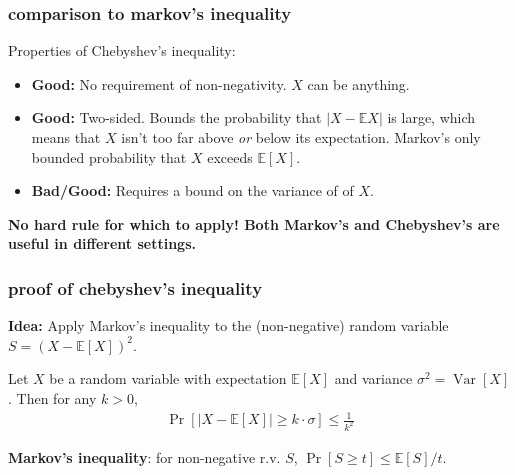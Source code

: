 \documentclass[handout,compress]{beamer}
\newcommand{\E}{\mathbb{E}}
\newcommand{\blue}[1]{\textcolor{blue}{#1}}
\DeclareMathOperator{\Var}{Var}
\begin{document}
\begin{frame}
	\frametitle{comparison to markov's inequality}
	\small
	Properties of Chebyshev's inequality:
	\begin{itemize}
		\item \textbf{Good:} No requirement of non-negativity. $X$ can be anything.
		\item \textbf{Good:} Two-sided. Bounds the probability that $|X - \E X|$ is large, which means that $X$ isn't too far above \emph{or} below its expectation. Markov's only bounded probability that $X$ exceeds $\E[X]$.
		\item \textbf{Bad/Good:} Requires a bound on the variance of of $X$.  
	\end{itemize}
	\alert{\textbf{No hard rule for which to apply! Both Markov's and Chebyshev's are useful in different settings.}}
\end{frame} 

\begin{frame}
	\frametitle{proof of chebyshev's inequality}
	\small
	\textbf{Idea:} Apply Markov's inequality to the (non-negative) random variable $S = (X-\E[X])^2$.
	\begin{lemma}
		Let $X$ be a random variable with expectation $\E[X]$ and variance $\sigma^2 = \Var[X]$. Then for any $k > 0$,
		\begin{align*}
			\Pr[|X - \E[X]| \geq k\cdot\sigma] \leq \frac{1}{k^2}
		\end{align*}
	\end{lemma}
	
	\vspace{7em}
	\begin{block}{\vspace*{-3ex}}
		\small \textbf{Markov's inequality}: for non-negative r.v. $S$, $\Pr[S \geq t] \leq \E[S]/t$.  
	\end{block}
\end{frame}
\end{document}
